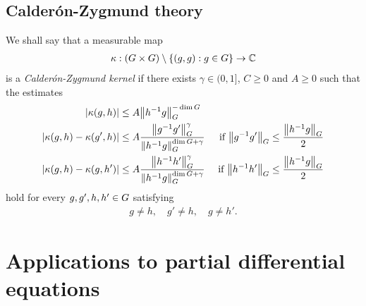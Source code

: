 \subsection{Calder\'on-Zygmund theory}

\begin{definition}
    We shall say that a measurable map
    \begin{align*}
        \kappa : (\Group \times \Group) \setminus \{(g, g) : g \in \Group\} \to \C
    \end{align*}
    is a \emph{Calder\'on-Zygmund kernel}
    if there exists $\gamma \in (0, 1]$,
    $C \geq 0$ and $A \geq 0$ such that the estimates
    \begin{align*}
        \abs {\kappa(g, h)} &\leq A \norm [\Group] {h^{-1} g}^{-\dim \Group} &\\
        \abs {\kappa(g, h) - \kappa(g', h)} &\leq A \frac {\norm [\Group] {g^{-1} g'}^{\gamma}} {\norm [\Group] {h^{-1} g}^{\dim \Group + \gamma}}
        &\text{ if } \norm [\Group] {g^{-1} g'} \leq \frac {\norm [\Group] {h^{-1} g}} 2\\
        \abs {\kappa(g, h) - \kappa(g, h')} &\leq A \frac {\norm [\Group] {h^{-1} h'}^{\gamma}} {\norm [\Group] {h^{-1} g}^{\dim \Group + \gamma}}
        &\text{ if } \norm [\Group] {h^{-1} h'} \leq \frac {\norm [\Group] {h^{-1} g}} 2
    \end{align*}
    hold for every $g, g', h, h' \in \Group$ satisfying
    \begin{align*}
        g \neq h, \quad
        g' \neq h, \quad
        g \neq h'.
    \end{align*}
\end{definition}

\section{Applications to partial differential equations}
